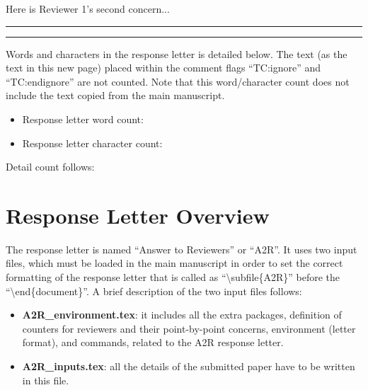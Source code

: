 \documentclass[./IEEE_Journal.tex]{subfiles}
\begin{document}
\begin{point}
     Here is Reviewer 1's second concern...
\end{point}


\reviewersection 
{} 



\vspace{2cm} \hrule \vspace{0.2cm} \hrule \vspace{0.5cm}

\color{magenta}

Words and characters in the response letter is detailed below. 
The text (as the text in this new page) placed within the comment flags ``TC:ignore'' and ``TC:endignore'' are not counted.
Note that this word/character count does not include the text copied from the main manuscript.

\begin{itemize}
    \item Response letter word count: 
    \item Response letter character count: 
\end{itemize}

\par{Detail count follows:}

\color{black}







\twocolumn


\section{Response Letter Overview}\label{sec:overview}
The response letter is named ``Answer to Reviewers'' or ``A2R''.
It uses two input files, which must be loaded in the main manuscript in order to set the correct formatting of the response letter that is called as ``\textbackslash subfile\{A2R\}'' before the ``\textbackslash end\{document\}''.
A brief description of the two input files follows:
\begin{itemize}
    \item \textbf{A2R\_environment.tex}: it includes all the extra packages, definition of counters for reviewers and their point-by-point concerns, environment (letter format), and commands, related to the A2R response letter.
    \item \textbf{A2R\_inputs.tex}: all the details of the submitted paper have to be written in this file. 
\end{itemize}
\end{document}
